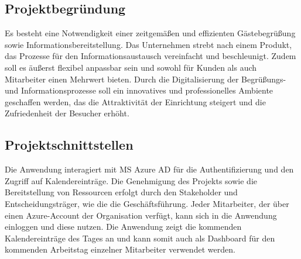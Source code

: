 \subsection{Projektbegründung} 
\label{sec:Projektbegruendung}
Es besteht eine Notwendigkeit einer zeitgemäßen und effizienten Gästebegrüßung sowie Informationsbereitstellung.
Das Unternehmen strebt nach einem Produkt, das Prozesse für den Informationsaustausch vereinfacht und beschleunigt.
Zudem soll es äußerst flexibel anpassbar sein und sowohl für Kunden als auch Mitarbeiter einen Mehrwert bieten.
Durch die Digitalisierung der Begrüßungs- und Informationsprozesse soll ein innovatives und professionelles Ambiente geschaffen werden, das die Attraktivität der Einrichtung steigert und die Zufriedenheit der Besucher erhöht.


\subsection{Projektschnittstellen} 
\label{sec:Projektschnittstellen}
Die Anwendung interagiert mit \ac{MS} Azure \ac{AD} für die Authentifizierung und den Zugriff auf Kalendereinträge.
Die Genehmigung des Projekts sowie die Bereitstellung von Ressourcen erfolgt durch den Stakeholder und Entscheidungsträger, wie \bspw die die Geschäftsführung.
Jeder Mitarbeiter, der über einen Azure-Account der Organisation verfügt, kann sich in die Anwendung einloggen und diese nutzen.
Die Anwendung zeigt die kommenden Kalendereinträge des Tages an und kann somit auch als Dashboard für den kommenden Arbeitstag einzelner Mitarbeiter verwendet werden.

